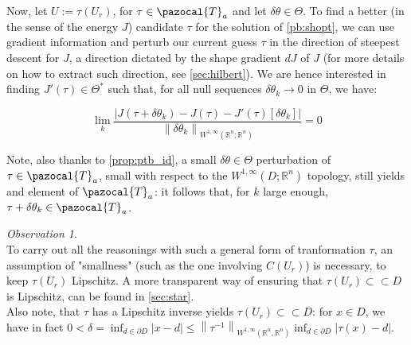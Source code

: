 \documentclass[english,a4paper,9pt,oneside]{scrbook}	%
\theoremstyle{break}
\theoremstyle{remark}
\newtheorem{obs}[equation]{Observation}
\newcommand{\mR}{\mathbb{R}}
\newcommand{\norm}[1]{\left\lVert#1\right\rVert}
\newcommand{\cc}{\subset\subset}
\newcommand{\cT}{\pazocal{T}}
\newcommand{\id}{\text{Id}}
\newcommand{\te}{\theta}
\newcommand{\Te}{\Theta}
\begin{document}
Now, let $U:=\tau(U_r)$, for $\tau \in \cT_a$ and let $\delta \te \in \Te$. To find a better (in the sense of the energy $J$) candidate $\tau$ for the solution of \cref{pb:shopt}, we can use gradient information and perturb our current guess $\tau$ in the direction of steepest descent for $J$, a direction dictated by the shape gradient $dJ$ of $J$ (for more details on how to extract such direction, see \cref{sec:hilbert}). We are hence interested in finding $J'(\tau) \in \Te^*$ such that, for all null sequences $\delta \te_k \rightarrow 0$ in $\Te$, we have:


$$\lim_{k}\frac{|J(\tau+\delta \te_k)-J(\tau)-J'(\tau)[\delta \te_k]|}{\norm{\delta \te_k}_{W^{1,\infty}(\mR^n;\mR^n)}}=0$$


Note, also thanks to \cref{prop:ptb_id}, a small $\delta \te \in \Te$ perturbation of $\tau \in \cT_a$, small with respect to the $W^{1,\infty}(D;\mR^n)$ topology, still yields and element of $\cT_a$: it follows that, for $k$ large enough, $\tau+\delta \te_k \in \cT_a$.


\begin{obs}
\mbox{}\\
To carry out all the reasonings with such a general form of tranformation $\tau$, an assumption of "smallness" (such as the one involving $C(U_r)$) is necessary, to keep $\tau(U_r)$ Lipschitz. A more transparent way of ensuring that $\tau(U_r)\cc D$ is Lipschitz, can be found in \cref{sec:star}.
\mbox{}\\
Also note, that $\tau$ has a Lipschitz inverse yields $\tau(U_r)\cc D$: for $x \in D$, we have in fact $0<\delta = \inf_{d \in \partial D}|x-d|\leq \norm{\tau^{-1}}_{W^{1,\infty}(\mR^n,\mR^n)}\inf_{d \in \partial D}|\tau(x)-d|$.
\end{obs}

\end{document}
